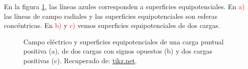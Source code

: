 En la  figura \ref{fig:SuperficiesEquipotenciales}, las líneas azules corresponden a superficies equipotenciales. En \textcolor{red}{a)} las líneas de campo radiales y las superficies equipotenciales son esferas concéntricas. En \textcolor{red}{b)} y \textcolor{red}{c)} vemos superficies equipotenciales de dos cargas.


\begin{figure}[H]
        \centering
         \hspace{1cm}
        \hspace{1cm}
        \caption{Campo eléctrico y superficies equipotenciales de una carga puntual positiva (a), de dos cargas con signos opuestos (b) y dos cargas positivas (c). Recuperado de: \href{https://tikz.net/electric_fieldlines2/}{tikz.net}. } \label{fig:SuperficiesEquipotenciales}
    \end{figure}


